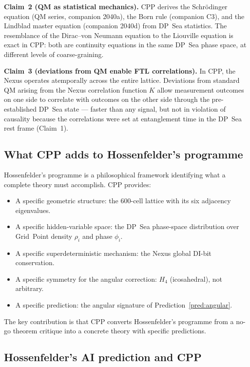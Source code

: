 \documentclass[11pt,letterpaper]{article}
\begin{document}
\textbf{Claim~2 (QM as statistical mechanics).}
CPP derives the Schrödinger equation (QM series, companion 2040a),
the Born rule (companion C3), and the Lindblad master equation
(companion 2040d) from DP~Sea statistics.  The resemblance of
the Dirac--von Neumann equation to the Liouville equation is
exact in CPP: both are continuity equations in the same DP~Sea
phase space, at different levels of coarse-graining.

\textbf{Claim~3 (deviations from QM enable FTL correlations).}
In CPP, the Nexus operates atemporally across the entire lattice.
Deviations from standard QM arising from the Nexus correlation
function $K$ allow measurement outcomes on one side to correlate
with outcomes on the other side through the pre-established
DP~Sea state --- faster than any signal, but not in violation of
causality because the correlations were set at entanglement time
in the DP~Sea rest frame (Claim~1).

\subsection{What CPP adds to Hossenfelder's programme}

Hossenfelder's programme is a philosophical framework identifying
what a complete theory must accomplish.  CPP provides:
\begin{itemize}
\item A specific geometric structure: the 600-cell lattice with its
  six adjacency eigenvalues.
\item A specific hidden-variable space: the DP~Sea phase-space
  distribution over Grid~Point density $\rho_i$ and phase $\phi_i$.
\item A specific superdeterministic mechanism: the Nexus global
  DI-bit conservation.
\item A specific symmetry for the angular correction: $H_4$
  (icosahedral), not arbitrary.
\item A specific prediction: the angular signature of
  Prediction~\ref{pred:angular}.
\end{itemize}

The key contribution is that CPP converts Hossenfelder's programme
from a no-go theorem critique into a concrete theory with specific
predictions.

\subsection{Hossenfelder's AI prediction and CPP}
\end{document}
